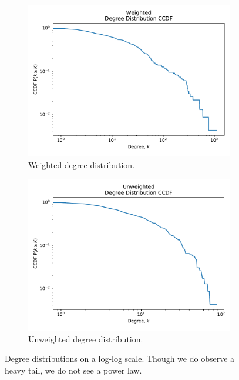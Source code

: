 \begin{figure}[ht]
    \centering
    \begin{subfigure}{0.4\textwidth}
        \includegraphics[width=1.\textwidth]{images/weighted_degree_distr_ccdf.pdf}
        \caption{Weighted degree distribution.}
    \end{subfigure}
    \begin{subfigure}{0.4\textwidth}
        \includegraphics[width=1.\textwidth]{images/unweighted_degree_distr_ccdf.pdf}
        \caption{Unweighted degree distribution.}
    \end{subfigure}
    \caption{Degree distributions on a log-log scale. Though we do observe a heavy tail, we do not see a power law.}
    \label{fig:degree_distr}
\end{figure}

